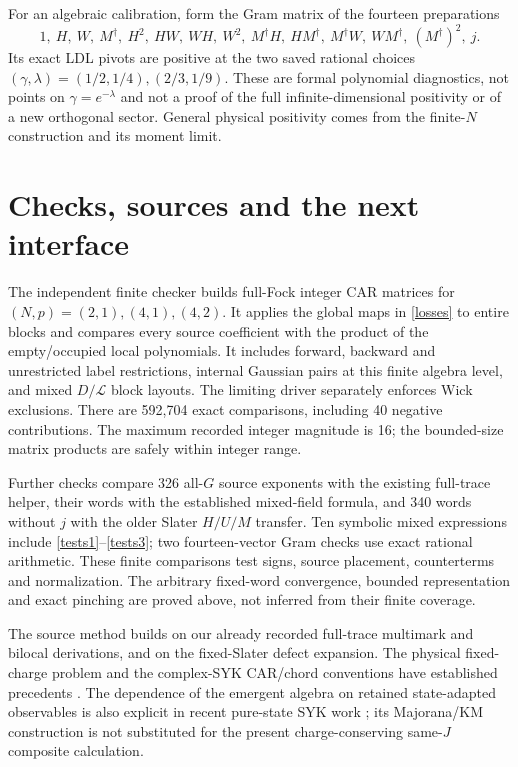 \documentclass[11pt]{article}
\begin{document}
For an algebraic calibration, form the Gram matrix of the fourteen
preparations
\begin{equation}
 1,\ H,\ W,\ M^\dagger,\ H^2,\ HW,\ WH,\ W^2,\
 M^\dagger H,\ HM^\dagger,\ M^\dagger W,\ WM^\dagger,\
 (M^\dagger)^2,\ j.
\end{equation}
Its exact LDL pivots are positive at the two saved rational choices
$(\gamma,\lambda)=(1/2,1/4),(2/3,1/9)$.
These are formal polynomial diagnostics, not points on
$\gamma=e^{-\lambda}$ and not a proof of the full infinite-dimensional
positivity or of a new orthogonal sector. General physical positivity
comes from the finite-$N$ construction and its moment limit.

\newpage
\section{Checks, sources and the next interface}
The independent finite checker builds full-Fock integer CAR matrices
for $(N,p)=(2,1),(4,1),(4,2)$. It applies the global maps in
\eqref{losses} to entire blocks and compares every source coefficient
with the product of the empty/occupied local polynomials. It includes
forward, backward and unrestricted label restrictions, internal
Gaussian pairs at this finite algebra level, and mixed $D/\mathcal L$
block layouts. The limiting driver separately enforces Wick exclusions.
There are 592,704 exact comparisons, including 40 negative contributions.
The maximum recorded integer magnitude is 16; the bounded-size matrix
products are safely within integer range.

Further checks compare 326 all-$G$ source exponents with the existing
full-trace helper, their words with the established mixed-field
formula, and 340 words without $j$ with the older Slater $H/U/M$
transfer. Ten symbolic mixed expressions include
\eqref{tests1}--\eqref{tests3}; two fourteen-vector Gram checks use
exact rational arithmetic. These finite comparisons test signs,
source placement, counterterms and normalization. The arbitrary
fixed-word convergence, bounded representation and exact pinching
are proved above, not inferred from their finite coverage.

The source method builds on our already recorded full-trace
multimark and bilocal derivations, and on the fixed-Slater defect
expansion. The physical fixed-charge problem and the complex-SYK
CAR/chord conventions have established precedents \cite{bnr}.
The dependence of the emergent algebra on retained state-adapted
observables is also explicit in recent pure-state SYK work
\cite{rx}; its Majorana/KM construction is not substituted for the
present charge-conserving same-$J$ composite calculation.
\end{document}
